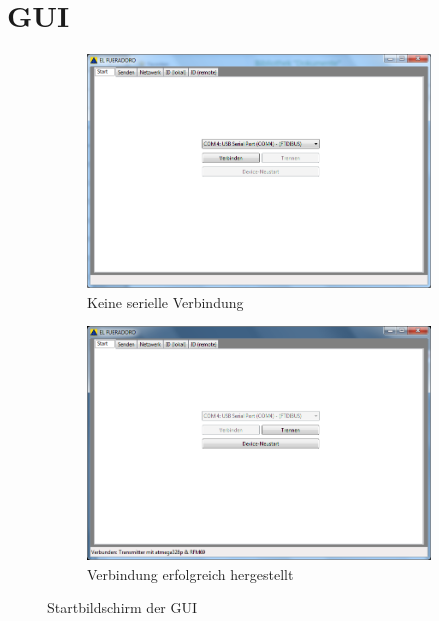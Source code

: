 \documentclass[pdftex, parskip, numbers=noenddot, toc=listof]{scrbook}
\begin{document}
	\section{GUI}

	\begin{figure}[!h]%
		\centering
		\begin{subfigure}[t]{0.45\textwidth}
			\includegraphics[width=\textwidth]{bilder/gui-start}
			\caption{Keine serielle Verbindung}
			\label{fig:gui-unconnected}
		\end{subfigure}%
		\begin{subfigure}[t]{0.45\textwidth}
			\includegraphics[width=\textwidth]{bilder/gui-connected}
			\caption{Verbindung erfolgreich hergestellt}
			\label{fig:gui-connected}
		\end{subfigure}%
		\caption{Startbildschirm der GUI}
		\label{fig:gui-start}
	\end{figure}%
\end{document}
